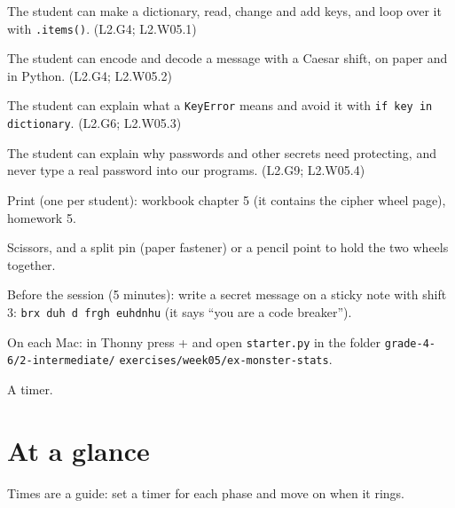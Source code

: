 
\begin{objectives}
  \item The student can make a dictionary, read, change and add keys, and loop over it with \texttt{.items()}. (L2.G4; L2.W05.1)
  \item The student can encode and decode a message with a Caesar shift, on paper and in Python. (L2.G4; L2.W05.2)
  \item The student can explain what a \texttt{KeyError} means and avoid it with \texttt{if key in dictionary}. (L2.G6; L2.W05.3)
  \item The student can explain why passwords and other secrets need protecting, and never type a real password into our programs. (L2.G9; L2.W05.4)
\end{objectives}

\begin{materials}
  \item Print (one per student): workbook chapter 5 (it contains the cipher wheel page), homework 5.
  \item Scissors, and a split pin (paper fastener) or a pencil point to hold the two wheels together.
  \item Before the session (5 minutes): write a secret message on a sticky note with shift 3: \texttt{brx duh d frgh euhdnhu}
        (it says \enquote{you are a code breaker}).
  \item On each Mac: in Thonny press + and open \texttt{starter.py} in the folder \texttt{grade-4-6/2-intermediate/} \texttt{exercises/week05/ex-monster-stats}.
  \item A timer.
\end{materials}

\section{At a glance}
Times are a guide: set a timer for each phase and move on when it rings.
\begin{timeplan}
\end{timeplan}

